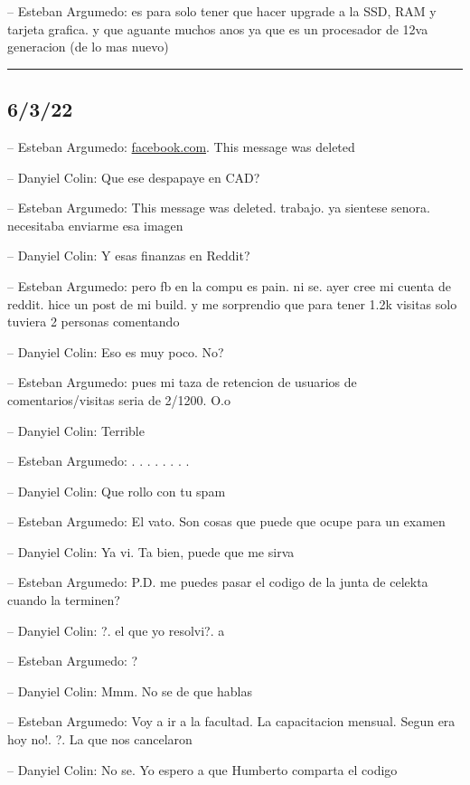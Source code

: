 -- Esteban Argumedo: es para solo tener que hacer upgrade a la SSD, RAM
y tarjeta grafica. y que aguante muchos anos ya que es un procesador de
12va generacion (de lo mas nuevo)

\begin{center}\rule{0.5\linewidth}{0.5pt}\end{center}

\hypertarget{section-93}{%
\subsection{6/3/22}\label{section-93}}

-- Esteban Argumedo:
\href{https://www.facebook.com/reel/526190629141441?fs=e\&s=cl}{facebook.com}.
This message was deleted

-- Danyiel Colin: Que ese despapaye en CAD?

-- Esteban Argumedo: This message was deleted. trabajo. ya sientese
senora. necesitaba enviarme esa imagen

-- Danyiel Colin: Y esas finanzas en Reddit?

-- Esteban Argumedo: pero fb en la compu es pain. ni se. ayer cree mi
cuenta de reddit. hice un post de mi build. y me sorprendio que para
tener 1.2k visitas solo tuviera 2 personas comentando

-- Danyiel Colin: Eso es muy poco. No?

-- Esteban Argumedo: pues mi taza de retencion de usuarios de
comentarios/visitas seria de 2/1200. O.o

-- Danyiel Colin: Terrible

-- Esteban Argumedo: . . . . . . . .

-- Danyiel Colin: Que rollo con tu spam

-- Esteban Argumedo: El vato. Son cosas que puede que ocupe para un
examen

-- Danyiel Colin: Ya vi. Ta bien, puede que me sirva

-- Esteban Argumedo: P.D. me puedes pasar el codigo de la junta de
celekta cuando la terminen?

-- Danyiel Colin: ?. el que yo resolvi?. a

-- Esteban Argumedo: ?

-- Danyiel Colin: Mmm. No se de que hablas

-- Esteban Argumedo: Voy a ir a la facultad. La capacitacion mensual.
Segun era hoy no!. ?. La que nos cancelaron

-- Danyiel Colin: No se. Yo espero a que Humberto comparta el codigo

